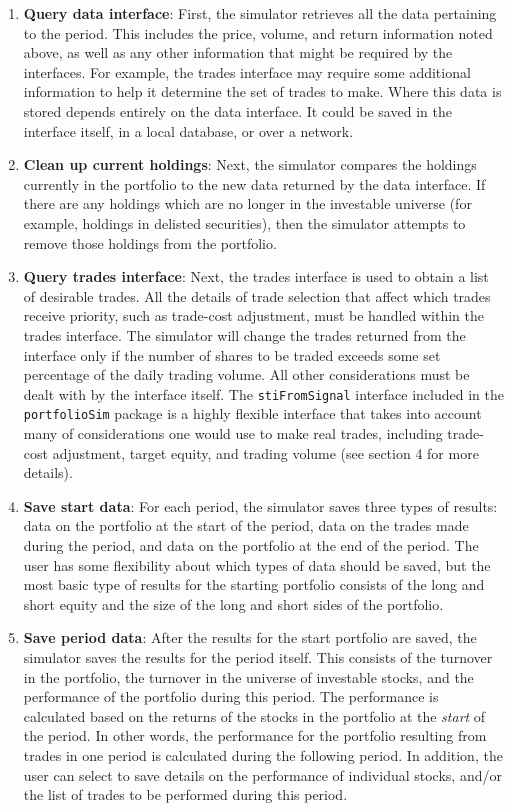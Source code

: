 \documentclass{article}
\begin{document}
\begin{enumerate}

\item{\bf{Query data interface}}: First, the simulator retrieves
all the data pertaining to the period.  This includes the price,
volume, and return information noted above, as well as any other
information that might be required by the interfaces.  For example,
the trades interface may require some additional information to help
it determine the set of trades to make.  Where this data is stored
depends entirely on the data interface.  It could be saved in the
interface itself, in a local database, or over a network.

\item{\bf{Clean up current holdings}}: Next, the simulator compares
the holdings currently in the portfolio to the new data returned by
the data interface.  If there are any holdings which are no longer in
the investable universe (for example, holdings in delisted
securities), then the simulator attempts to remove those holdings from
the portfolio.

\item{\bf{Query trades interface}}: Next, the trades interface is
used to obtain a list of desirable trades.  All the details of trade
selection that affect which trades receive priority, such as
trade-cost adjustment, must be handled within the trades interface.
The simulator will change the trades returned from the interface only
if the number of shares to be traded exceeds some set percentage of
the daily trading volume.  All other considerations must be dealt with
by the interface itself.  The \texttt{stiFromSignal} interface
included in the \texttt{portfolioSim} package is a highly flexible
interface that takes into account many of considerations one would use
to make real trades, including trade-cost adjustment, target equity,
and trading volume (see section 4 for more details).

\item{\bf{Save start data}}: For each period, the simulator saves
three types of results: data on the portfolio at the start of the
period, data on the trades made during the period, and data on the
portfolio at the end of the period.  The user has some flexibility
about which types of data should be saved, but the most basic type of
results for the starting portfolio consists of the long and short
equity and the size of the long and short sides of the portfolio.

\item{\bf{Save period data}}: After the results for the start
portfolio are saved, the simulator saves the results for the period
itself.  This consists of the turnover in the portfolio, the turnover
in the universe of investable stocks, and the performance of the
portfolio during this period.  The performance is calculated based on
the returns of the stocks in the portfolio at the \emph{start} of the
period.  In other words, the performance for the portfolio resulting
from trades in one period is calculated during the following period.
In addition, the user can select to save details on the performance of
individual stocks, and/or the list of trades to be performed during
this period.


\end{enumerate}
\end{document}
